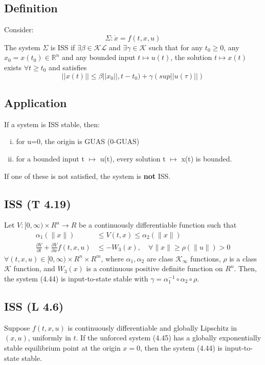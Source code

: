 \documentclass{article}
\begin{document}
\subsection{Definition}
Consider:
\begin{equation}
	\Sigma : \dot x = f(t, x, u)
\end{equation}
The system $\Sigma$ is ISS if $\exists\beta \in \mathcal{K} \mathcal{L}$ and $\exists\gamma \in \mathcal{K}$ such that for any $t_0 \geq 0$, any $x_0 = x(t_0) \in \mathbb{R}^n$ and any bounded input $t \mapsto u(t)$, the solution $t\mapsto x(t)$ exists $\forall t \geq t_0$ and satisfies
\begin{equation}
	||x(t)||\leq\beta||x_0||,t-t_0)+\gamma(sup||u(\tau)||)
\end{equation}
\subsection{Application}
If a system is ISS stable, then:
\begin{enumerate}[i)]
	\item for u=0, the origin is GUAS (0-GUAS)
	\item for a bounded input t $\mapsto$ u(t), every solution t $\mapsto$ x(t) is bounded.
\end{enumerate}
If one of these is not satisfied, the system is \textbf{not} ISS.
\subsection{ISS (T 4.19)}
Let $V:[0, \infty) \times R^n \rightarrow R$ be a continuously differentiable function such that
$$
	\begin{aligned}
		\alpha_1(\|x\|)                                                        & \leq V(t, x) \leq \alpha_2(\|x\|)                  \\
		\frac{\partial V}{\partial t}+\frac{\partial V}{\partial x} f(t, x, u) & \leq-W_3(x), \quad \forall\|x\| \geq \rho(\|u\|)>0
	\end{aligned}
$$
$\forall(t, x, u) \in[0, \infty) \times R^n \times R^m$, where $\alpha_1, \alpha_2$ are class $\mathcal{K}_{\infty}$ functions, $\rho$ is a class $\mathcal{K}$ function, and $W_3(x)$ is a continuous positive definite function on $R^n$. Then, the system (4.44) is input-to-state stable with $\gamma=\alpha_1^{-1} \circ \alpha_2 \circ \rho$.
\subsection{ISS (L 4.6)}
Suppose $f(t, x, u)$ is continuously differentiable and globally Lipschitz in $(x, u)$, uniformly in $t$. If the unforced system (4.45) has a globally exponentially stable equilibrium point at the origin $x=0$, then the system (4.44) is input-to-state stable.
\end{document}
